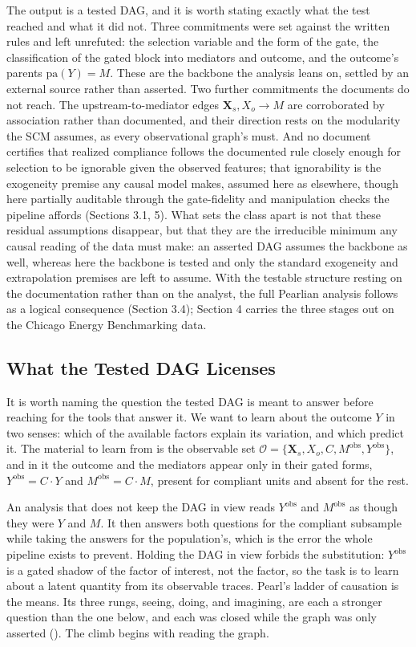 The output is a tested DAG, and it is worth stating exactly what the test reached and what it did not. Three commitments were set against the written rules and left unrefuted: the selection variable and the form of the gate, the classification of the gated block into mediators and outcome, and the outcome's parents $\mathrm{pa}(Y) = M$. These are the backbone the analysis leans on, settled by an external source rather than asserted. Two further commitments the documents do not reach. The upstream-to-mediator edges $\mathbf{X}_s, X_o \to M$ are corroborated by association rather than documented, and their direction rests on the modularity the SCM assumes, as every observational graph's must. And no document certifies that realized compliance follows the documented rule closely enough for selection to be ignorable given the observed features; that ignorability is the exogeneity premise any causal model makes, assumed here as elsewhere, though here partially auditable through the gate-fidelity and manipulation checks the pipeline affords (Sections 3.1, 5). What sets the class apart is not that these residual assumptions disappear, but that they are the irreducible minimum any causal reading of the data must make: an asserted DAG assumes the backbone as well, whereas here the backbone is tested and only the standard exogeneity and extrapolation premises are left to assume. With the testable structure resting on the documentation rather than on the analyst, the full Pearlian analysis follows as a logical consequence (Section 3.4); Section 4 carries the three stages out on the Chicago Energy Benchmarking data.

\subsection{What the Tested DAG Licenses}

It is worth naming the question the tested DAG is meant to answer before reaching for the tools that answer it. We want to learn about the outcome $Y$ in two senses: which of the available factors explain its variation, and which predict it. The material to learn from is the observable set $\mathcal{O} = \{\mathbf{X}_s, X_o, C, M^{\text{obs}}, Y^{\text{obs}}\}$, and in it the outcome and the mediators appear only in their gated forms, $Y^{\text{obs}} = C \cdot Y$ and $M^{\text{obs}} = C \cdot M$, present for compliant units and absent for the rest.

An analysis that does not keep the DAG in view reads $Y^{\text{obs}}$ and $M^{\text{obs}}$ as though they were $Y$ and $M$. It then answers both questions for the compliant subsample while taking the answers for the population's, which is the error the whole pipeline exists to prevent. Holding the DAG in view forbids the substitution: $Y^{\text{obs}}$ is a gated shadow of the factor of interest, not the factor, so the task is to learn about a latent quantity from its observable traces. Pearl's ladder of causation is the means. Its three rungs, seeing, doing, and imagining, are each a stronger question than the one below, and each was closed while the graph was only asserted (). The climb begins with reading the graph.

